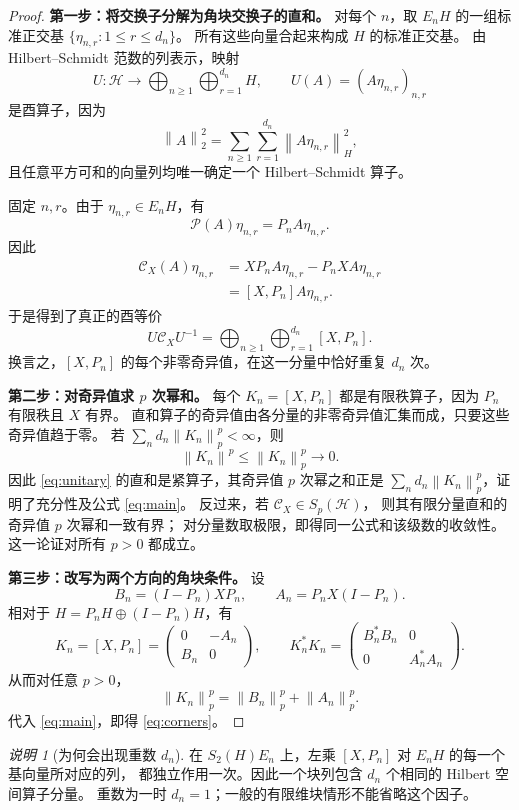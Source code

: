 \documentclass[UTF8,11pt,a4paper,fontset=fandol]{ctexart}
\theoremstyle{remark}
\newtheorem{remark}[theorem]{说明}
\newcommand{\PP}{\mathcal P}
\newcommand{\CC}{\mathcal C}
\newcommand{\HH}{\mathcal H}
\newcommand{\norm}[1]{\left\lVert #1\right\rVert}
\begin{document}
\begin{proof}
\textbf{第一步：将交换子分解为角块交换子的直和。}
对每个 $n$，取 $E_nH$ 的一组标准正交基
$\{\eta_{n,r}:1\leq r\leq d_n\}$。
所有这些向量合起来构成 $H$ 的标准正交基。
由 Hilbert--Schmidt 范数的列表示，映射
\[
 U:\HH\longrightarrow\bigoplus_{n\geq1}\bigoplus_{r=1}^{d_n}H,
 \qquad U(A)=(A\eta_{n,r})_{n,r}
\]
是酉算子，因为
\[
 \norm A_2^2=\sum_{n\geq1}\sum_{r=1}^{d_n}\norm{A\eta_{n,r}}_H^2,
\]
且任意平方可和的向量列均唯一确定一个 Hilbert--Schmidt 算子。

固定 $n,r$。由于 $\eta_{n,r}\in E_nH$，有
\[
 \PP(A)\eta_{n,r}=P_nA\eta_{n,r}.
\]
因此
\begin{align*}
 \CC_X(A)\eta_{n,r}
 &=XP_nA\eta_{n,r}-P_nXA\eta_{n,r}\\
 &=[X,P_n]A\eta_{n,r}.
\end{align*}
于是得到了真正的酉等价
\begin{equation}\label{eq:unitary}
 \boxed{\quad
 U\CC_XU^{-1}
 =\bigoplus_{n\geq1}\bigoplus_{r=1}^{d_n}[X,P_n].
 \quad}
\end{equation}
换言之，$[X,P_n]$ 的每个非零奇异值，在这一分量中恰好重复 $d_n$ 次。

\medskip
\textbf{第二步：对奇异值求 $p$ 次幂和。}
每个 $K_n=[X,P_n]$ 都是有限秩算子，因为 $P_n$ 有限秩且 $X$ 有界。
直和算子的奇异值由各分量的非零奇异值汇集而成，只要这些奇异值趋于零。
若 $\sum_nd_n\norm{K_n}_p^p<\infty$，则
\[
 \norm{K_n}^p\leq\norm{K_n}_p^p\longrightarrow0.
\]
因此 \eqref{eq:unitary} 的直和是紧算子，其奇异值 $p$ 次幂之和正是
$\sum_nd_n\norm{K_n}_p^p$，证明了充分性及公式 \eqref{eq:main}。
反过来，若 $\CC_X\in S_p(\HH)$，
则其有限分量直和的奇异值 $p$ 次幂和一致有界；
对分量数取极限，即得同一公式和该级数的收敛性。
这一论证对所有 $p>0$ 都成立。

\medskip
\textbf{第三步：改写为两个方向的角块条件。}
设
\[
 B_n=(I-P_n)XP_n,
 \qquad A_n=P_nX(I-P_n).
\]
相对于 $H=P_nH\oplus(I-P_n)H$，有
\[
 K_n=[X,P_n]=\begin{pmatrix}0&-A_n\\B_n&0\end{pmatrix},
 \qquad
 K_n^*K_n=\begin{pmatrix}B_n^*B_n&0\\0&A_n^*A_n\end{pmatrix}.
\]
从而对任意 $p>0$，
\[
 \norm{K_n}_p^p=\norm{B_n}_p^p+\norm{A_n}_p^p.
\]
代入 \eqref{eq:main}，即得 \eqref{eq:corners}。
\end{proof}

\begin{remark}[为何会出现重数 $d_n$]
在 $S_2(H)E_n$ 上，左乘 $[X,P_n]$ 对 $E_nH$ 的每一个基向量所对应的列，
都独立作用一次。因此一个块列包含 $d_n$ 个相同的 Hilbert 空间算子分量。
重数为一时 $d_n=1$；一般的有限维块情形不能省略这个因子。
\end{remark}
\end{document}
